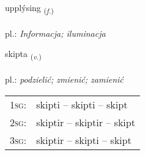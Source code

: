 \documentclass[frontgrid, backgrid]{flacards}\usepackage[]{graphicx}\usepackage[]{xcolor}
\begin{document}
\renewcommand{\blhead}{\vskip5pt {\small\bfseries\footnotesize Nafnorð | rzeczownik }}
\renewcommand{\bcfoot}{\vskip5pt \hspace{2pt}{\small\bfseries\footnotesize 1K}}


{upplýsing \small{\textsubscript{(\textit{f.})}} \\[1ex] %
\textphonetic{[ʏhplisiŋk]} \\
pl.: \emph{Informacja; iluminacja} \\  [2ex]
\renewcommand*{\arraystretch}{0.8}
}

\renewcommand{\flhead}{\vskip5pt \fboxsep=0pt {\small\bfseries\footnotesize Sagnorð | czasownik}}
\renewcommand{\fcfoot}{\vskip5pt \fboxsep=0pt \hspace{2pt}{\small\bfseries\footnotesize 1K}}

\renewcommand{\blhead}{\vskip5pt {\small\bfseries\footnotesize Sagnorð | czasownik }}
\renewcommand{\bcfoot}{\vskip5pt \hspace{2pt}{\small\bfseries\footnotesize 1K}}


{skipta \small{\textsubscript{(\textit{v.})}} \\[1ex] %
\textphonetic{[scɪfta]} \\
pl.: \emph{podzielić; zmienić; zamienić} \\  [2ex]
\renewcommand*{\arraystretch}{0.8}
\begin{tabular}{p{1cm}l}
\textsc{1sg}: & skipti -- skipti -- skipt \\ 
\textsc{2sg}: & skiptir -- skiptir -- skipt \\ 
\textsc{3sg}: & skiptir -- skipti -- skipt \\ 
\end{tabular}
}
\end{document}
